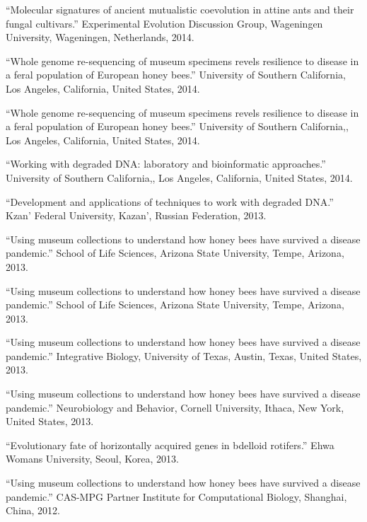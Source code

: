 \documentclass[11pt]{article}
\def\printdate#1{\xprintdate#1-}
\def\xprintdate#1-#2-#3-{#1}
\begin{document}
\ind ``Molecular signatures of ancient mutualistic coevolution in attine ants
and their fungal cultivars.'' Experimental Evolution Discussion Group, Wageningen University, Wageningen, Netherlands, \printdate{2014-00-00}.


\ind ``Whole genome re-sequencing of museum specimens revels resilience to
disease in a feral population of European honey bees.'' University of Southern California, Los Angeles, California, United States, \printdate{2014-00-00}.


\ind ``Whole genome re-sequencing of museum specimens revels resilience to
disease in a feral population of European honey bees.'' University of Southern California,, Los Angeles, California, United States, \printdate{2014-00-00}.


\ind ``Working with degraded DNA: laboratory and bioinformatic approaches.'' University of Southern California,, Los Angeles, California, United States, \printdate{2014-00-00}.


\ind ``Development and applications of techniques to work with degraded DNA.'' Kzan' Federal University, Kazan', Russian Federation, \printdate{2013-00-00}.



\ind ``Using museum collections to understand how honey bees have survived a
disease pandemic.'' School of Life Sciences, Arizona State University, Tempe, Arizona, \printdate{2013-00-00}.


\ind ``Using museum collections to understand how honey bees have survived a
disease pandemic.'' School of Life Sciences, Arizona State University, Tempe, Arizona, \printdate{2013-00-00}.


\ind ``Using museum collections to understand how honey bees have survived a
disease pandemic.'' Integrative Biology, University of Texas, Austin, Texas, United States, \printdate{2013-00-00}.


\ind ``Using museum collections to understand how honey bees have survived a
disease pandemic.'' Neurobiology and Behavior, Cornell University, Ithaca, New York, United States, \printdate{2013-00-00}.


\ind ``Evolutionary fate of horizontally acquired genes in bdelloid rotifers.'' Ehwa Womans University, Seoul, Korea, \printdate{2013-00-00}.


\ind ``Using museum collections to understand how honey bees have survived a
disease pandemic.'' CAS-MPG Partner Institute for Computational Biology, Shanghai, China, \printdate{2012-00-00}.
\end{document}
